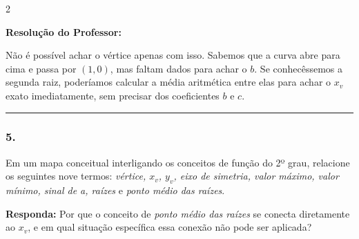 \begin{multicols*}{2}
\ifgabarito
    \begin{tcolorbox}[colback=CorTitUm!5, colframe=CorTitUm, boxrule=1pt, arc=4pt, left=6pt, right=6pt, top=6pt, bottom=6pt]
    \small\textbf{\textcolor{CorTitUm}{Resolução do Professor:}}\par\vspace{0.1cm}
    \color{CinzaEscuro}
    Não é possível achar o vértice apenas com isso. Sabemos que a curva abre para cima e passa por $(1,0)$, mas faltam dados para achar o $b$. Se conhecêssemos a segunda raiz, poderíamos calcular a média aritmética entre elas para achar o $x_v$ exato imediatamente, sem precisar dos coeficientes $b$ e $c$.
    \end{tcolorbox}
\fi

\par\vspace{\espacoQuestao}

\noindent\textcolor{CorLinha}{\rule{\linewidth}{0.5pt}} 
\par\vspace{\espacoPreQuestao}
\subsubsection*{5.} Em um mapa conceitual interligando os conceitos de função do 2º grau, relacione os seguintes nove termos: \textit{vértice, $x_v$, $y_v$, eixo de simetria, valor máximo, valor mínimo, sinal de a, raízes} e \textit{ponto médio das raízes}.

\begin{boxresponda}
\textbf{Responda:} Por que o conceito de \textit{ponto médio das raízes} se conecta diretamente ao $x_v$, e em qual situação específica essa conexão não pode ser aplicada?
\end{boxresponda}


\end{multicols*}

